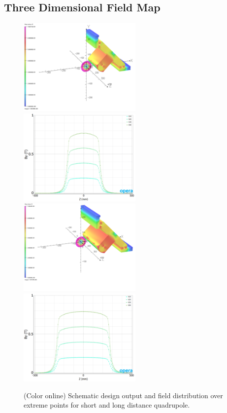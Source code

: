 \documentclass[jkps,preprint,fleqn,showpacs,showkeys]{revtex4}
\begin{document}
\subsection{Three Dimensional Field Map}
\begin{figure}[t]
  \begin{center}
    \includegraphics[width=6cm]{Fig04-1.png}
    \includegraphics[width=6cm]{Fig04-2.png}
    \includegraphics[width=6cm]{Fig04-3.png}
    \includegraphics[width=6cm]{Fig04-4.png}
    \caption{(Color online) Schematic design output and field distribution
      over extreme points for short and long distance quadrupole.}
    \label{fig3-1}
  \end{center}
\end{figure}
\end{document}
